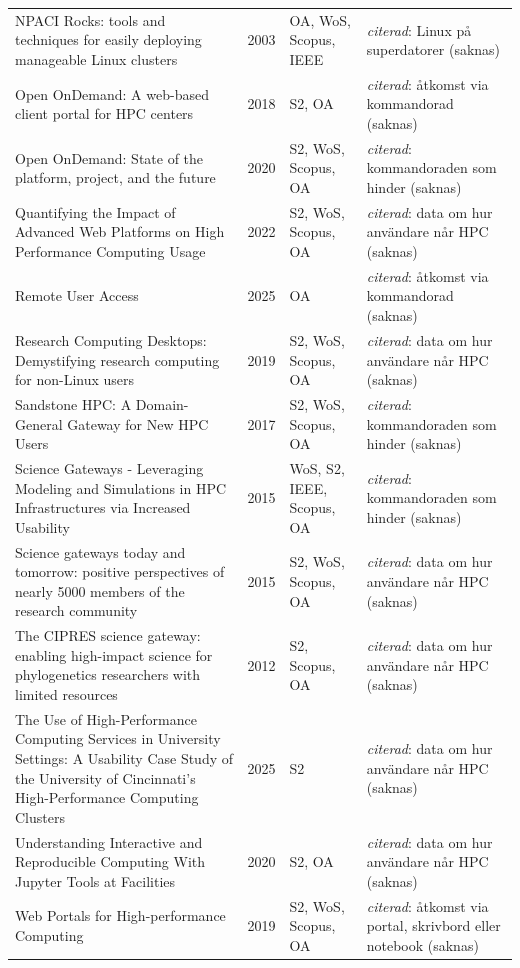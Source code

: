 \begin{longtable}{@{}%
  >{\raggedright\arraybackslash}p{}c%
  >{\raggedright\arraybackslash}p{}%
  >{\raggedright\arraybackslash}p{}@{}}
NPACI Rocks: tools and techniques for easily deploying manageable Linux clusters & 2003 & OA, WoS, Scopus, IEEE & \emph{citerad}: Linux på superdatorer (saknas) \\
Open OnDemand: A web-based client portal for HPC centers & 2018 & S2, OA & \emph{citerad}: åtkomst via kommandorad (saknas) \\
Open OnDemand: State of the platform, project, and the future & 2020 & S2, WoS, Scopus, OA & \emph{citerad}: kommandoraden som hinder (saknas) \\
Quantifying the Impact of Advanced Web Platforms on High Performance Computing Usage & 2022 & S2, WoS, Scopus, OA & \emph{citerad}: data om hur användare når HPC (saknas) \\
Remote User Access & 2025 & OA & \emph{citerad}: åtkomst via kommandorad (saknas) \\
Research Computing Desktops: Demystifying research computing for non-Linux users & 2019 & S2, WoS, Scopus, OA & \emph{citerad}: data om hur användare når HPC (saknas) \\
Sandstone HPC: A Domain-General Gateway for New HPC Users & 2017 & S2, WoS, Scopus, OA & \emph{citerad}: kommandoraden som hinder (saknas) \\
Science Gateways - Leveraging Modeling and Simulations in HPC Infrastructures via Increased Usability & 2015 & WoS, S2, IEEE, Scopus, OA & \emph{citerad}: kommandoraden som hinder (saknas) \\
Science gateways today and tomorrow: positive perspectives of nearly 5000 members of the research community & 2015 & S2, WoS, Scopus, OA & \emph{citerad}: data om hur användare når HPC (saknas) \\
The CIPRES science gateway: enabling high-impact science for phylogenetics researchers with limited resources & 2012 & S2, Scopus, OA & \emph{citerad}: data om hur användare når HPC (saknas) \\
The Use of High-Performance Computing Services in University Settings: A Usability Case Study of the University of Cincinnati's High-Performance Computing Clusters & 2025 & S2 & \emph{citerad}: data om hur användare når HPC (saknas) \\
Understanding Interactive and Reproducible Computing With Jupyter Tools at Facilities & 2020 & S2, OA & \emph{citerad}: data om hur användare når HPC (saknas) \\
Web Portals for High-performance Computing & 2019 & S2, WoS, Scopus, OA & \emph{citerad}: åtkomst via portal, skrivbord eller notebook (saknas) \\

\end{longtable}
